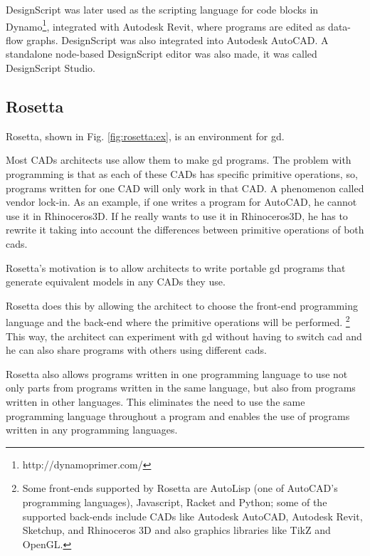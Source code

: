 DesignScript was later used as the scripting language for code blocks in Dynamo\footnote{http://dynamoprimer.com/}, integrated with Autodesk Revit, where programs are edited as data-flow graphs.
DesignScript was also integrated into Autodesk AutoCAD.
A standalone node-based DesignScript editor was also made, it was called DesignScript Studio.


\subsection{Rosetta}
\label{section:rosetta:related}
Rosetta\cite{de2012modern,lopes2011portable}, shown in Fig. \ref{fig:rosetta:ex}, is an environment for \gls{gd}.

Most CADs architects use allow them to make \gls{gd} programs.
The problem with programming is that as each of these CADs has specific primitive operations, so, programs written for one CAD will only work in that CAD.
A phenomenon called vendor lock-in.
As an example, if one writes a program for AutoCAD, he cannot use it in Rhinoceros3D.
If he really wants to use it in Rhinoceros3D, he has to rewrite it taking into account the differences between primitive operations of both \glspl{cad}.

Rosetta's motivation is to allow architects to write portable \gls{gd} programs that generate equivalent models in any CADs they use.

Rosetta does this by allowing the architect to choose the front-end programming language and the back-end where the primitive operations will be performed.%
\footnote{Some front-ends supported by Rosetta are AutoLisp (one of AutoCAD's programming languages), Javascript, Racket and Python; some of the supported back-ends include CADs like Autodesk AutoCAD, Autodesk Revit, Sketchup, and Rhinoceros 3D and also graphics libraries like TikZ and OpenGL.}
This way, the architect can experiment with \gls{gd} without having to switch \gls{cad} and he can also share programs with others using different \glspl{cad}.

Rosetta also allows programs written in one programming language to use not only parts from programs written in the same language, but also from programs written in other languages.
This eliminates the need to use the same programming language throughout a program and enables the use of programs written in any programming languages.

